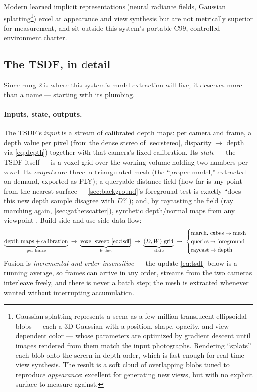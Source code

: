 \documentclass[11pt]{article}
\theoremstyle{definition}
\begin{document}
Modern learned implicit representations (neural radiance fields, Gaussian
splatting\footnote{Gaussian splatting represents a scene as a few million
translucent ellipsoidal blobs --- each a 3D Gaussian with a position,
shape, opacity, and view-dependent color --- whose parameters are
optimized by gradient descent until images rendered from them match the
input photographs. Rendering ``splats'' each blob onto the screen in
depth order, which is fast enough for real-time view synthesis. The
result is a soft cloud of overlapping blobs tuned to reproduce
\emph{appearance}: excellent for generating new views, but with no
explicit surface to measure against.}) excel at appearance and view
synthesis but are not metrically
superior for measurement, and sit outside this system's portable-C99,
controlled-environment charter.

\subsection{The TSDF, in detail}
\label{sec:tsdf}

Since rung 2 is where this system's model extraction will live, it
deserves more than a name --- starting with its plumbing.

\paragraph{Inputs, state, outputs.} The TSDF's \emph{input} is a stream
of calibrated depth maps: per camera and frame, a depth value per pixel
(from the dense stereo of \autoref{sec:stereo}, disparity $\to$ depth
via \eqref{eq:depth}) together with that camera's fixed calibration.
Its \emph{state} --- the TSDF itself --- is a voxel grid over the
working volume holding two numbers per voxel. Its \emph{outputs} are
three: a triangulated mesh (the ``proper model,'' extracted on demand,
exported as PLY); a queryable distance field (how far is any point from
the nearest surface --- \autoref{sec:background}'s foreground test is
exactly ``does this new depth sample disagree with $D$?''); and, by
raycasting the field (ray marching again, \autoref{sec:gatherscatter}),
synthetic depth/normal maps from any viewpoint
\cite{Newcombe2011}. Build-side and use-side data flow:
\[
\underbrace{\text{depth maps} + \text{calibration}}_{\text{per frame}}
\;\rightarrow\;
\underbrace{\text{voxel sweep \eqref{eq:tsdf}}}_{\text{fusion}}
\;\rightarrow\;
\underbrace{(D,W)\ \text{grid}}_{\text{state}}
\;\rightarrow\;
\begin{cases}
\text{march.\ cubes} \rightarrow \text{mesh}\\
\text{queries} \rightarrow \text{foreground}\\
\text{raycast} \rightarrow \text{depth}
\end{cases}
\]
Fusion is \emph{incremental and order-insensitive} --- the update
\eqref{eq:tsdf} below is a running average, so frames can arrive in any
order, streams from the two cameras interleave freely, and there is
never a batch step; the mesh is extracted whenever wanted without
interrupting accumulation.
\end{document}

